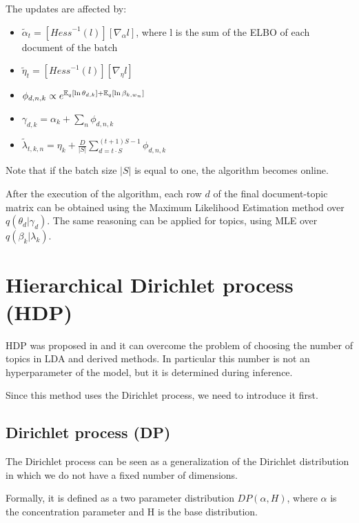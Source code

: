 The updates are affected by:
\begin{itemize}
    \item $\tilde{\alpha}_t = [\mathit{Hess}^{-1}(l)] [\nabla_{\alpha} l]$, where l is the sum of the ELBO of each document of the batch
    \item $\tilde{\eta}_t = [\mathit{Hess}^{-1}(l)] [\nabla_{\eta} l]$
    \item $\phi_{d,n,k} \propto e^{\operatorname*{\mathbb{E}}_q[\ln \theta_{d,k}] + \operatorname*{\mathbb{E}}_q[\ln \beta_{k, w_n}]}$
    \item $\gamma_{d,k} = \alpha_k + \sum_n \phi_{d,n,k}$
    \item $\tilde{\lambda}_{t,k,n} = \eta_k + \frac{D}{|S|} \sum_{d = t \cdot S}^{(t+1) S - 1} \phi_{d,n,k} $
\end{itemize}

Note that if the batch size $|S|$ is equal to one, the algorithm becomes online.

After the execution of the algorithm, each row $d$ of the final document-topic matrix
can be obtained using the Maximum Likelihood Estimation method over $q(\theta_d | \gamma_d)$.
The same reasoning can be applied for topics, using MLE over $q(\beta_k | \lambda_k)$.


\section{Hierarchical Dirichlet process (HDP)}


HDP was proposed in \cite{DBLP:journals/jmlr/WangPB11} and it can overcome the problem of choosing the number of topics in LDA and derived methods.
In particular this number is not an hyperparameter of the model, but it is determined during inference.

Since this method uses the Dirichlet process, we need to introduce it first.

\subsection{Dirichlet process (DP)}
The Dirichlet process can be seen as a generalization of the Dirichlet distribution
in which we do not have a fixed number of dimensions.

Formally, it is defined as a two parameter distribution $\mathit{DP}(\alpha, H)$,
where $\alpha$ is the concentration parameter and H is the base distribution.

